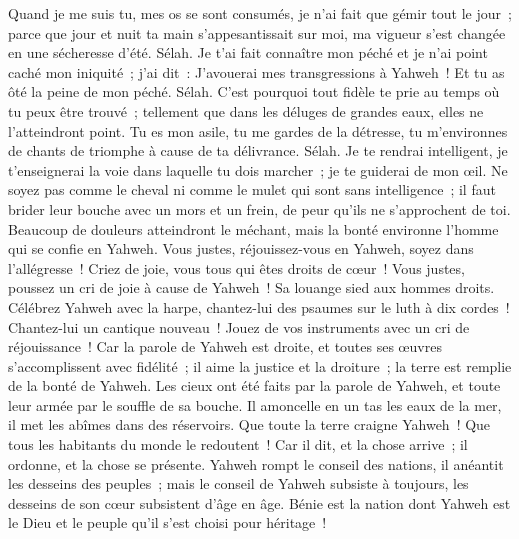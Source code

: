 \begin{multicols}{2}
Quand je me suis tu, mes os se sont consumés, je n'ai fait que gémir tout le jour~;
parce que jour et nuit ta main s'appesantissait sur moi, ma vigueur s'est changée en une sécheresse d'été. Sélah.
Je t'ai fait connaître mon péché et je n'ai point caché mon iniquité~; j'ai dit~: J'avouerai mes transgressions à Yahweh~! Et tu as ôté la peine de mon péché. Sélah.
C'est pourquoi tout fidèle te prie au temps où tu peux être trouvé~; tellement que dans les déluges de grandes eaux, elles ne l'atteindront point.
Tu es mon asile, tu me gardes de la détresse, tu m'environnes de chants de triomphe à cause de ta délivrance. Sélah.
Je te rendrai intelligent, je t'enseignerai la voie dans laquelle tu dois marcher~; je te guiderai de mon œil.
Ne soyez pas comme le cheval ni comme le mulet qui sont sans intelligence~; il faut brider leur bouche avec un mors et un frein, de peur qu'ils ne s'approchent de toi.
Beaucoup de douleurs atteindront le méchant, mais la bonté environne l'homme qui se confie en Yahweh.
Vous justes, réjouissez-vous en Yahweh, soyez dans l'allégresse~! Criez de joie, vous tous qui êtes droits de cœur~!
\VerseOne{}Vous justes, poussez un cri de joie à cause de Yahweh~! Sa louange sied aux hommes droits.
Célébrez Yahweh avec la harpe, chantez-lui des psaumes sur le luth à dix cordes~!
Chantez-lui un cantique nouveau~! Jouez de vos instruments avec un cri de réjouissance~!
Car la parole de Yahweh est droite, et toutes ses œuvres s'accomplissent avec fidélité~;
il aime la justice et la droiture~; la terre est remplie de la bonté de Yahweh.
Les cieux ont été faits par la parole de Yahweh, et toute leur armée par le souffle de sa bouche.
Il amoncelle en un tas les eaux de la mer, il met les abîmes dans des réservoirs.
Que toute la terre craigne Yahweh~! Que tous les habitants du monde le redoutent~!
Car il dit, et la chose arrive~; il ordonne, et la chose se présente.
Yahweh rompt le conseil des nations, il anéantit les desseins des peuples~;
mais le conseil de Yahweh subsiste à toujours, les desseins de son cœur subsistent d'âge en âge.
Bénie est la nation dont Yahweh est le Dieu et le peuple qu'il s'est choisi pour héritage~!

\end{multicols}
